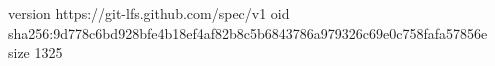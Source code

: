 version https://git-lfs.github.com/spec/v1
oid sha256:9d778c6bd928bfe4b18ef4af82b8c5b6843786a979326c69e0c758fafa57856e
size 1325
